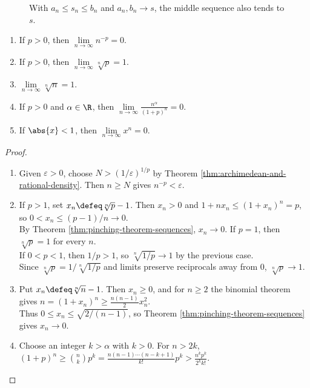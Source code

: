 \begin{figure}[H]
  \centering
  
  \caption{With $a_n\leq s_n\leq b_n$ and $a_n,b_n\to s$, the middle sequence also tends to $s$.}
  \label{fig:pinching-theorem-sequences}
\end{figure}

\begin{theorem} \label{thm:special-sequence-limits} 
\begin{enumerate}[label=(\roman*)]
\setlength{\itemsep}{0pt}
\item If $p>0$, then $\lim\limits_{n\to\infty}n^{-p}=0$.
\item If $p>0$, then $\lim\limits_{n\to\infty}\sqrt[n]{p}=1$.
\item $\lim\limits_{n\to\infty}\sqrt[n]{n}=1$.
\item If $p>0$ and $\alpha\in\R$, then $\lim\limits_{n\to\infty}\frac{n^\alpha}{(1+p)^n}=0$.
\item If $\abs{x}<1$, then $\lim\limits_{n\to\infty}x^n=0$.
\end{enumerate}
\begin{proof}
\begin{enumerate}[label=(\roman*)]
\setlength{\itemsep}{0pt}
\item Given $\varepsilon>0$, choose $N>(1/\varepsilon)^{1/p}$ by Theorem \ref{thm:archimedean-and-rational-density}. Then $n\geq N$ gives $n^{-p}<\varepsilon$.
\item If $p>1$, set $x_n\defeq\sqrt[n]{p}-1$. Then $x_n>0$ and $1+nx_n\leq(1+x_n)^n=p$, so $0<x_n\leq(p-1)/n\to0$.\\
By Theorem \ref{thm:pinching-theorem-sequences}, $x_n\to0$. If $p=1$, then $\sqrt[n]{p}=1$ for every $n$.\\
If $0<p<1$, then $1/p>1$, so $\sqrt[n]{1/p}\to1$ by the previous case.\\
Since $\sqrt[n]{p}=1/\sqrt[n]{1/p}$ and limits preserve reciprocals away from $0$, $\sqrt[n]{p}\to1$.
\item Put $x_n\defeq\sqrt[n]{n}-1$. Then $x_n\geq0$, and for $n\geq2$ the binomial theorem gives $n=(1+x_n)^n\geq \frac{n(n-1)}{2}x_n^2$.\\
Thus $0\leq x_n\leq\sqrt{2/(n-1)}$, so Theorem \ref{thm:pinching-theorem-sequences} gives $x_n\to0$.
\item Choose an integer $k>\alpha$ with $k>0$. For $n>2k$, $(1+p)^n\geq \binom{n}{k}p^k=\frac{n(n-1)\cdots(n-k+1)}{k!}p^k>\frac{n^k p^k}{2^k k!}$.\\

\end{enumerate}
\end{proof}
\end{theorem}
